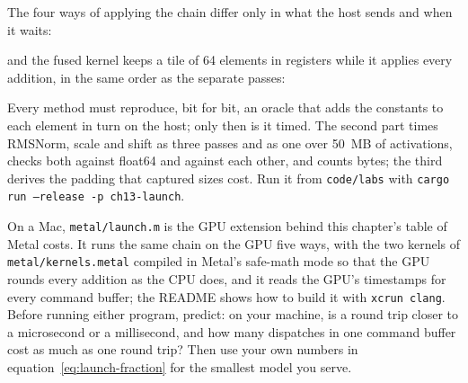 
\noindent The four ways of applying the chain differ only in what the host sends
and when it waits:


\noindent and the fused kernel keeps a tile of 64 elements in registers while
it applies every addition, in the same order as the separate passes:


\noindent Every method must reproduce, bit for bit, an oracle that adds the
constants to each element in turn on the host; only then is it timed. The
second part times RMSNorm, scale and shift as three passes and as one over
50~MB of activations, checks both against float64 and against each other, and
counts bytes; the third derives the padding that captured sizes cost. Run it
from \texttt{code/labs} with \texttt{cargo run --release -p ch13-launch}.

On a Mac, \texttt{metal/launch.m} is the GPU extension behind this chapter's
table of Metal costs. It runs the same chain on the GPU five ways, with the two
kernels of \texttt{metal/kernels.metal} compiled in Metal's safe-math mode so
that the GPU rounds every addition as the CPU does, and it reads the GPU's
timestamps for every command buffer; the README shows how to build it with
\texttt{xcrun clang}. Before running either program, predict: on your machine,
is a round trip closer to a microsecond or a millisecond, and how many
dispatches in one command buffer cost as much as one round trip? Then use your
own numbers in equation~\eqref{eq:launch-fraction} for the smallest model you
serve.


